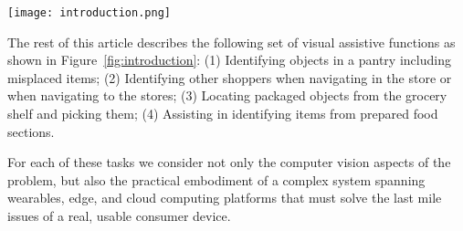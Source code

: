\begin{figure*}[!htb]
\centering
\texttt{[image: introduction.png]}
\caption{Applications and underlying technologies for visual assist in grocery shopping.}
\label{fig:introduction}
\end{figure*} 

The rest of this article describes the following set of visual
assistive functions as shown in Figure~\ref{fig:introduction}:
(1) Identifying objects in a pantry including misplaced items; 
(2) Identifying other shoppers when navigating in the
store or when navigating to the stores; 
(3) Locating packaged objects from the grocery shelf and picking them; 
(4) Assisting in identifying items from prepared food sections. 

For each of these tasks we consider not only the computer vision
aspects of the problem, but also the practical embodiment of a
complex system spanning wearables, edge, and cloud computing
platforms that must solve the last mile issues of a real, usable
consumer device.
